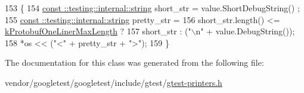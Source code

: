 \begin{DoxyCode}
153                                                          \{
154     \hyperlink{namespacetesting_1_1internal_a8e8ff5b11e64078831112677156cb111}{const ::testing::internal::string} short\_str = value.ShortDebugString()
      ;
155     \hyperlink{namespacetesting_1_1internal_a8e8ff5b11e64078831112677156cb111}{const ::testing::internal::string} pretty\_str =
156         short\_str.length() <= \hyperlink{namespacetesting_1_1internal2_a140c8efd51e63a3def98445bff107518}{kProtobufOneLinerMaxLength} ?
157         short\_str : (\textcolor{stringliteral}{"\(\backslash\)n"} + value.DebugString());
158     *os << (\textcolor{stringliteral}{"<"} + pretty\_str + \textcolor{stringliteral}{">"});
159   \}
\end{DoxyCode}


The documentation for this class was generated from the following file\+:\begin{DoxyCompactItemize}
\item 
vendor/googletest/googletest/include/gtest/\hyperlink{gtest-printers_8h}{gtest-\/printers.\+h}\end{DoxyCompactItemize}
